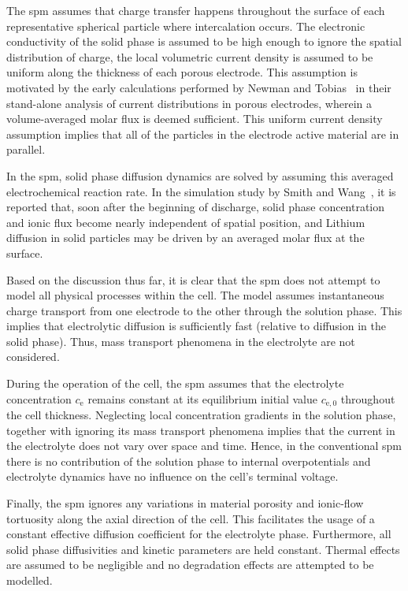 The  \gls{spm}  assumes that  charge  transfer  happens throughout  the  surface
of  each  representative  spherical  particle where  intercalation  occurs.  The
electronic  conductivity of  the solid  phase is  assumed to  be high  enough to
ignore the  spatial distribution of  charge, \ie{} the local  volumetric current
density is assumed  to be uniform along the thickness  of each porous electrode.
This assumption is  motivated by the early calculations performed  by Newman and
Tobias~\cite{Newman1962} in their stand-alone  analysis of current distributions
in porous electrodes, wherein a volume-averaged molar flux is deemed sufficient.
This uniform current density assumption implies that all of the particles in the
electrode active material are in parallel.


In the  \gls{spm}, solid phase  diffusion dynamics  are solved by  assuming this
averaged electrochemical  reaction rate.  In the simulation  study by  Smith and
Wang~\cite{Smith2006},  it  is  reported  that,  soon  after  the  beginning  of
discharge, solid phase concentration and ionic flux become nearly independent of
spatial position, and  Lithium diffusion in solid particles may  be driven by an
averaged molar flux at the surface.


Based  on the  discussion thus  far, it  is clear  that the  \gls{spm} does  not
attempt  to model  all physical  processes within  the cell.  The model  assumes
instantaneous  charge transport  from one  electrode  to the  other through  the
solution phase.  This implies that  electrolytic diffusion is  sufficiently fast
(relative to  diffusion in the solid  phase). Thus, mass transport  phenomena in
the electrolyte are not considered.


During the  operation of the  cell, the  \gls{spm} assumes that  the electrolyte
concentration  $c_\text{e}$ remains  constant at  its equilibrium  initial value
$c_{\text{e},0}$ throughout  the cell thickness. Neglecting  local concentration
gradients  in the  solution phase,  together  with ignoring  its mass  transport
phenomena implies that  the current in the electrolyte does  not vary over space
and time. Hence,  in the conventional \gls{spm} there is  no contribution of the
solution  phase to  internal  overpotentials and  electrolyte  dynamics have  no
influence on the cell's terminal voltage.


Finally,  the  \gls{spm}  ignores  any   variations  in  material  porosity  and
ionic-flow tortuosity  along the axial  direction of the cell.  This facilitates
the  usage of  a constant  effective diffusion  coefficient for  the electrolyte
phase. Furthermore,  all solid  phase diffusivities  and kinetic  parameters are
held constant. Thermal  effects are assumed to be negligible  and no degradation
effects are attempted to be modelled.


